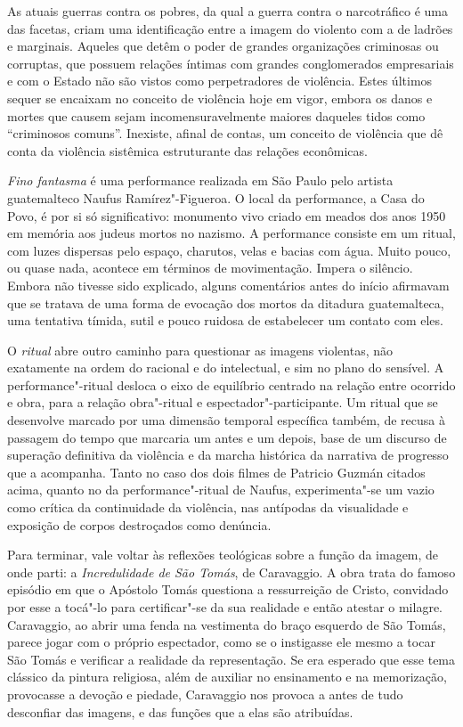 As atuais guerras contra os pobres, da qual a guerra contra o
narcotráfico é uma das facetas, criam uma identificação entre a imagem do violento com a
de ladrões e marginais. Aqueles que detêm o poder de grandes
organizações criminosas ou corruptas, que possuem relações íntimas com
grandes conglomerados empresariais e com o Estado não são vistos como perpetradores de violência. Estes últimos sequer se
encaixam no conceito de violência hoje em vigor, embora os danos e
mortes que causem sejam incomensuravelmente maiores daqueles tidos como
``criminosos comuns''. Inexiste, afinal de contas, um conceito de
violência que dê conta da violência sistêmica estruturante das
relações econômicas.

\asterisc

\emph{Fino fantasma} é uma performance realizada em São Paulo pelo
artista guatemalteco Naufus Ramírez"-Figueroa. O local da performance, a
Casa do Povo, é por si só significativo: monumento vivo criado em meados
dos anos 1950 em memória aos judeus mortos no nazismo. A performance
consiste em um ritual, com luzes dispersas pelo espaço, charutos, velas
e bacias com água. Muito pouco, ou quase nada, acontece em términos de
movimentação. Impera o silêncio. Embora não tivesse sido explicado,
alguns comentários antes do início afirmavam que se tratava de uma forma
de evocação dos mortos da ditadura guatemalteca, uma tentativa tímida,
sutil e pouco ruidosa de estabelecer um contato com eles.

O \emph{ritual} abre outro caminho para questionar as imagens violentas,
não exatamente na ordem do racional e do intelectual, e sim no plano do
sensível. A performance"-ritual desloca o eixo de equilíbrio centrado na
relação entre ocorrido e obra, para a relação obra"-ritual e
espectador"-participante. Um ritual que se desenvolve marcado por uma
dimensão temporal específica também, de recusa à passagem do tempo que
marcaria um antes e um depois, base de um discurso de superação definitiva da
violência e da marcha histórica da narrativa de progresso que a
acompanha. Tanto no caso dos dois filmes de Patricio Guzmán citados
acima, quanto no da performance"-ritual de Naufus, experimenta"-se um vazio
como crítica da continuidade da violência, nas antípodas da visualidade
e exposição de corpos destroçados como denúncia.

\asterisc

Para terminar, vale voltar às reflexões teológicas sobre a função da
imagem, de onde parti: a \emph{Incredulidade de São Tomás}, de
Caravaggio. A obra trata do famoso episódio em que o Apóstolo Tomás
questiona a ressurreição de Cristo, convidado por esse a tocá"-lo para
certificar"-se da sua realidade e então atestar o milagre. Caravaggio,
ao abrir uma fenda na vestimenta do braço esquerdo de São Tomás, parece
jogar com o próprio espectador, como se o instigasse ele mesmo a tocar São
Tomás e verificar a realidade da representação. Se era esperado que esse
tema clássico da pintura religiosa, além de auxiliar no ensinamento e na
memorização, provocasse a devoção e piedade, Caravaggio nos provoca a
antes de tudo desconfiar das imagens, e das funções que a elas são
atribuídas.

